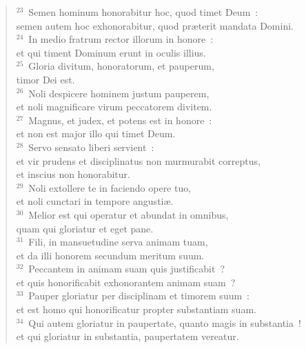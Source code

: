 \begin{flushleft}\begin{verse}${}^{23}$~Semen hominum honorabitur hoc, quod timet Deum~:\\ semen autem hoc exhonorabitur, quod pr\ae terit mandata Domini.\\
${}^{24}$~In medio fratrum rector illorum in honore~:\\ et qui timent Dominum erunt in oculis illius.\\
${}^{25}$~Gloria divitum, honoratorum, et pauperum,\\ timor Dei est.\\
${}^{26}$~Noli despicere hominem justum pauperem,\\ et noli magnificare virum peccatorem divitem.\\
${}^{27}$~Magnus, et judex, et potens est in honore~:\\ et non est major illo qui timet Deum.\\
${}^{28}$~Servo sensato liberi servient~:\\ et vir prudens et disciplinatus non murmurabit correptus,\\ et inscius non honorabitur.\\
${}^{29}$~Noli extollere te in faciendo opere tuo,\\ et noli cunctari in tempore angusti\ae .\\
${}^{30}$~Melior est qui operatur et abundat in omnibus,\\ quam qui gloriatur et eget pane.\\
${}^{31}$~Fili, in mansuetudine serva animam tuam,\\ et da illi honorem secundum meritum suum.\\
${}^{32}$~Peccantem in animam suam quis justificabit~?\\ et quis honorificabit exhonorantem animam suam~?\\
${}^{33}$~Pauper gloriatur per disciplinam et timorem suum~:\\ et est homo qui honorificatur propter substantiam suam.\\
${}^{34}$~Qui autem gloriatur in paupertate, quanto magis in substantia~!\\ et qui gloriatur in substantia, paupertatem vereatur.\end{verse}\end{flushleft}


